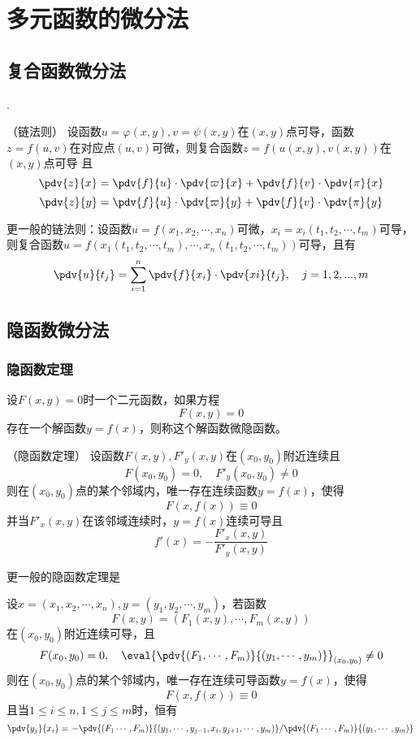 \section{多元函数的微分法}
\subsection{复合函数微分法}
.
\begin{theorem}
    （链法则）
    \label{th:链法则}
    设函数$u=\varphi(x,y),v=\psi(x,y)$在$(x,y)$点可导，函数$z=f(u,v)$在对应点$(u,v)$可微，则复合函数$z=f(u(x,y),v(x,y))$在$(x,y)$点可导
    且
    \[
        \pdv{z}{x} = \pdv{f}{u}\cdot\pdv{\varpi}{x} + \pdv{f}{v}\cdot\pdv{\pi}{x}
    \]
    \[
        \pdv{z}{y} = \pdv{f}{u}\cdot\pdv{\varpi}{y} + \pdv{f}{v}\cdot\pdv{\pi}{y}
    \]
\end{theorem}

\begin{theorem}
    更一般的链法则：设函数$u=f(x_1,x_2,\cdots,x_n)$可微，$x_i=x_i(t_1,t_2,\cdots,t_m)$可导，则复合函数$u=f(x_1(t_1,t_2,\cdots,t_m),\cdots,x_n(t_1,t_2,\cdots,t_m))$可导，且有
    \[
        \pdv{u}{t_j} = \sum_{i=1}^n \pdv{f}{x_i}\cdot\pdv{ xi}{t_j}, \quad j = 1,2,...,m
    \]
\end{theorem}

\subsection{隐函数微分法}
\subsubsection{隐函数定理}
设$F(x,y)=0$时一个二元函数，如果方程
\[ F(x,y) = 0 \]
存在一个解函数$y=f(x)$，则称这个解函数微隐函数。
\begin{theorem}
    （隐函数定理）
    \label{th:隐函数定理}
    设函数$F(x,y),F'_y(x,y)$在$(x_0,y_0)$附近连续且
    \[ F(x_0,y_0) = 0, \quad F'_y(x_0,y_0)\neq 0 \]
    则在$(x_0,y_0)$点的某个邻域内，唯一存在连续函数$y=f(x)$，使得
    \[ F(x,f(x)) \equiv 0 \]
    并当$F'_x(x,y)$在该邻域连续时，$y=f(x)$连续可导且
    \[ f'(x) = - \frac{F'_x(x,y)}{F'_y(x,y)} \]
\end{theorem}

更一般的隐函数定理是
\begin{theorem}
    设$x=(x_1,x_2,\cdots,x_n),y=(y_1,y_2,\cdots,y_m)$，若函数
    \[ F(x,y) = (F_1(x,y),\cdots,F_m(x,y)) \]
    在$(x_0,y_0)$附近连续可导，且
    \[ F(x_0,y_0) = 0, \quad\eval{\pdv{(F_1,\cdots,F_m)}{(y_1,\cdots,y_m)}}_{(x_0,y_0)} \neq 0 \]
    则在$(x_0,y_0)$点的某个邻域内，唯一存在连续可导函数$y=f(x)$，使得
    \[ F(x,f(x))\equiv 0 \]
    且当$1\leq i \leq n, 1\leq j\leq m$时，恒有
    \[
        \pdv{y_j}{x_i}
        =
        \left.
        - \pdv{(F_1\cdots,F_m)}{(y_1,\cdots,y_{j-1},x_i,y_{j+1},\cdots,y_m)}
        \middle/
        \pdv{(F_1\cdots,F_m)}{(y_1,\cdots,y_m)}
        \right.
    \]
\end{theorem}

